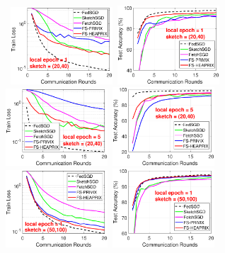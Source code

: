\documentclass[11pt]{article}
\begin{document}
\begin{figure}[t]
	\begin{center}
		\mbox{\hspace{-0.1in}			  
		 \includegraphics[width=1.5in]{MNIST_figures/local1_sketch20_iid1_train_loss.eps} \hspace{-0.12in}
		 \includegraphics[width=1.5in]{MNIST_figures/local1_sketch20_iid1_test_acc.eps} 
		\includegraphics[width=1.5in]{MNIST_figures/local5_sketch20_iid1_train_loss.eps}\hspace{-0.12in}
		\includegraphics[width=1.5in]{MNIST_figures/local5_sketch20_iid1_test_acc.eps}
		}
		\mbox{\hspace{-0.15in}	
		\includegraphics[width=1.5in]{MNIST_figures/local1_sketch50_iid1_train_loss.eps} \hspace{-0.12in}
		\includegraphics[width=1.5in]{MNIST_figures/local1_sketch50_iid1_test_acc.eps} 
}
\end{center}
\end{figure}
\end{document}
